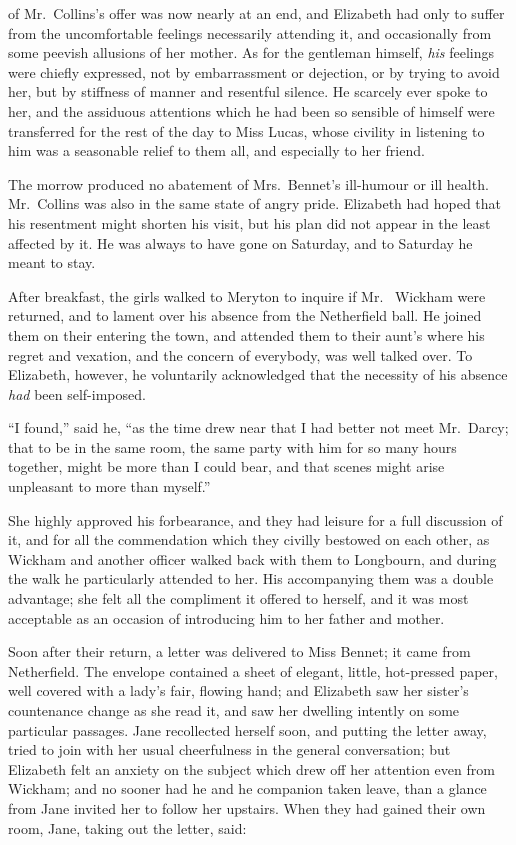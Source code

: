  of Mr.\ Collins's offer was now nearly at an end,
and Elizabeth had only to suffer from the uncomfortable feelings
necessarily attending it, and occasionally from some peevish
allusions of her mother.  As for the gentleman himself, \emph{his}
feelings were chiefly expressed, not by embarrassment or
dejection, or by trying to avoid her, but by stiffness of manner
and resentful silence.  He scarcely ever spoke to her, and the
assiduous attentions which he had been so sensible of himself
were transferred for the rest of the day to Miss Lucas, whose
civility in listening to him was a seasonable relief to them all,
and especially to her friend.

The morrow produced no abatement of Mrs.\ Bennet's ill-humour
or ill health.  Mr.\ Collins was also in the same state of angry
pride.  Elizabeth had hoped that his resentment might shorten his
visit, but his plan did not appear in the least affected by it.
He was always to have gone on Saturday, and to Saturday he meant
to stay.

After breakfast, the girls walked to Meryton to inquire if Mr.\ %
Wickham were returned, and to lament over his absence from
the Netherfield ball.  He joined them on their entering the town,
and attended them to their aunt's where his regret and vexation,
and the concern of everybody, was well talked over.  To
Elizabeth, however, he voluntarily acknowledged that the
necessity of his absence \emph{had} been self-imposed.

``I found,'' said he, ``as the time drew near that I had better not
meet Mr.\ Darcy; that to be in the same room, the same party
with him for so many hours together, might be more than I could
bear, and that scenes might arise unpleasant to more than
myself.''

She highly approved his forbearance, and they had leisure for a
full discussion of it, and for all the commendation which they
civilly bestowed on each other, as Wickham and another officer
walked back with them to Longbourn, and during the walk he
particularly attended to her.  His accompanying them was a
double advantage; she felt all the compliment it offered to
herself, and it was most acceptable as an occasion of introducing
him to her father and mother.

Soon after their return, a letter was delivered to Miss Bennet;
it came from Netherfield.  The envelope contained a sheet of
elegant, little, hot-pressed paper, well covered with a lady's fair,
flowing hand; and Elizabeth saw her sister's countenance change
as she read it, and saw her dwelling intently on some particular
passages.  Jane recollected herself soon, and putting the letter
away, tried to join with her usual cheerfulness in the general
conversation; but Elizabeth felt an anxiety on the subject which
drew off her attention even from Wickham; and no sooner had
he and he companion taken leave, than a glance from Jane
invited her to follow her upstairs.  When they had gained their
own room, Jane, taking out the letter, said:

